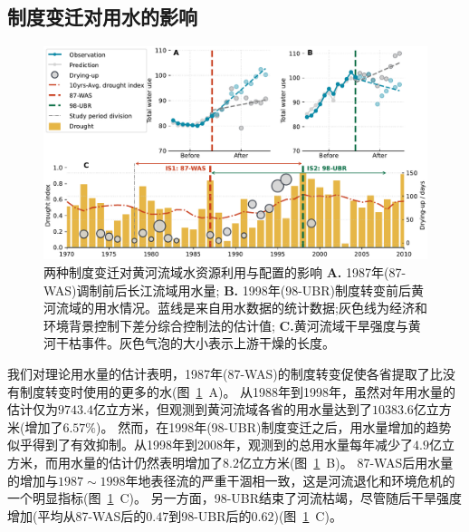 

\subsection{制度变迁对用水的影响}
\label{result-2}

\begin{figure}[!htb]
	\centering
	\includegraphics[width=\linewidth]{img/ch5/main_results2.pdf}
	\caption[两种制度变迁对黄河流域水资源利用与配置的影响]{
        两种制度变迁对黄河流域水资源利用与配置的影响
        \textbf{A.} 1987年(87-WAS)调制前后长江流域用水量;
        \textbf{B.} 1998年(98-UBR)制度转变前后黄河流域的用水情况。蓝线是来自用水数据的统计数据;灰色线为经济和环境背景控制下差分综合控制法的估计值;
        \textbf{C.}黄河流域干旱强度与黄河干枯事件。灰色气泡的大小表示上游干燥的长度。
	}\label{fig:main_results}
\end{figure}


\label{result-1-p2}
我们对理论用水量的估计表明，1987年(87-WAS)的制度转变促使各省提取了比没有制度转变时使用的更多的水(图~\ref{fig:main_results}~A)。
从1988年到1998年，虽然对年用水量的估计仅为$9743.4$亿立方米，但观测到黄河流域各省的用水量达到了$10383.6$亿立方米(增加了$6.57\%$)。
然而，在1998年(98-UBR)制度变迁之后，用水量增加的趋势似乎得到了有效抑制。从1998年到2008年，观测到的总用水量每年减少了$4.9$亿立方米，而用水量的估计仍然表明增加了$8.2$亿立方米(图~\ref{fig:main_results}~B)。
87-WAS后用水量的增加与$1987 \sim 1998$年地表径流的严重干涸相一致，这是河流退化和环境危机的一个明显指标(图~\ref{fig:main_results}~C)。
另一方面，98-UBR结束了河流枯竭，尽管随后干旱强度增加(平均从87-WAS后的$0.47$到98-UBR后的$0.62$)(图~\ref{fig:main_results}~C)。


